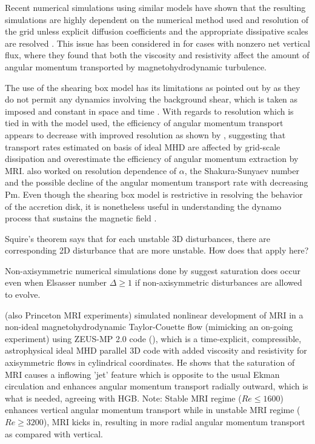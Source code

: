 \documentclass{jfm}
\begin{document}
Recent numerical simulations using similar models have shown that the resulting
simulations are highly dependent on the numerical method used and resolution of
the grid unless explicit diffusion coefficients and the appropriate dissipative
scales are resolved \citep{Fromang&Papaloizou2007, Fromang2007}. This
issue has been considered in \cite{Lesur2007} for cases with nonzero
net vertical flux, where they found that both the viscosity and resistivity
affect the amount of angular momentum transported by magnetohydrodynamic
turbulence. 

The use of the shearing box model has its limitations as pointed out by
\cite{Hawley1995} as they do not permit any dynamics involving the background
shear, which is taken as imposed and constant in space and time
\citep{Regev2008}. With regards to resolution which is tied in with the model
used, the efficiency of angular momentum transport appears to decrease with
improved resolution as shown by \cite{Fromang2007}, suggesting that transport
rates estimated on basis of ideal MHD are affected by grid-scale dissipation
and overestimate the efficiency of angular momentum extraction by MRI.
\cite{Kapyla2011} also worked on resolution dependence of $\alpha$, the
Shakura-Sunyaev number and the possible decline of the angular momentum
transport rate with decreasing Pm. Even though the shearing box model is
restrictive in resolving the behavior of the accretion disk, it is nonetheless
useful in understanding the dynamo process that sustains the magnetic field
\cite{Lesur2008}.

Squire's theorem says that for each unstable 3D disturbances, there are
corresponding 2D disturbance that are more unstable. How does that apply here?

Non-axisymmetric numerical simulations done by \cite{Fleming2000} suggest
saturation does occur even when Elsasser number $\Delta \ge 1$ if
non-axisymmetric disturbances are allowed to evolve.

\cite{Liu2008} (also Princeton MRI experiments) simulated nonlinear development
of MRI in a non-ideal magnetohydrodynamic Taylor-Couette flow (mimicking an
on-going experiment) using ZEUS-MP 2.0 code (\cite{Hayes2006}), which is a
time-explicit, compressible, astrophysical ideal MHD parallel 3D code with
added viscosity and resistivity for axisymmetric flows in cylindrical
coordinates. He shows that the saturation of MRI causes a inflowing 'jet'
feature which is opposite to the usual Ekman circulation and enhances angular
momentum transport radially outward, which is what is needed, agreeing with
HGB. Note: Stable MRI regime ($ Re \le 1600$) enhances vertical angular
momentum transport while in unstable MRI regime ($Re \ge 3200$), MRI kicks in,
resulting in more radial angular momentum transport as compared with vertical.
\end{document}
